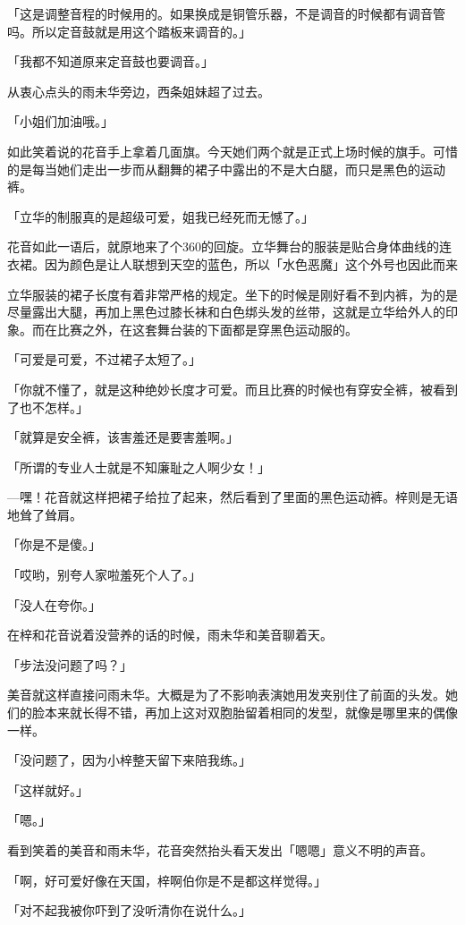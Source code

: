 \documentclass[UTF8]{ctexart}
\begin{document}
    「这是调整音程的时候用的。如果换成是铜管乐器，不是调音的时候都有调音管吗。所以定音鼓就是用这个踏板来调音的。」

    「我都不知道原来定音鼓也要调音。」

    从衷心点头的雨未华旁边，西条姐妹超了过去。

    「小姐们加油哦。」

    如此笑着说的花音手上拿着几面旗。今天她们两个就是正式上场时候的旗手。可惜的是每当她们走出一步而从翻舞的裙子中露出的不是大白腿，而只是黑色的运动裤。

    「立华的制服真的是超级可爱，姐我已经死而无憾了。」

    花音如此一语后，就原地来了个360的回旋。立华舞台的服装是贴合身体曲线的连衣裙。因为颜色是让人联想到天空的蓝色，所以「水色恶魔」这个外号也因此而来

    立华服装的裙子长度有着非常严格的规定。坐下的时候是刚好看不到内裤，为的是尽量露出大腿，再加上黑色过膝长袜和白色绑头发的丝带，这就是立华给外人的印象。而在比赛之外，在这套舞台装的下面都是穿黑色运动服的。

    「可爱是可爱，不过裙子太短了。」

    「你就不懂了，就是这种绝妙长度才可爱。而且比赛的时候也有穿安全裤，被看到了也不怎样。」

    「就算是安全裤，该害羞还是要害羞啊。」

    「所谓的专业人士就是不知廉耻之人啊少女！」

    —嘿！花音就这样把裙子给拉了起来，然后看到了里面的黑色运动裤。梓则是无语地耸了耸肩。

    「你是不是傻。」

    「哎哟，别夸人家啦羞死个人了。」

    「没人在夸你。」

    在梓和花音说着没营养的话的时候，雨未华和美音聊着天。

    「步法没问题了吗？」

    美音就这样直接问雨未华。大概是为了不影响表演她用发夹别住了前面的头发。她们的脸本来就长得不错，再加上这对双胞胎留着相同的发型，就像是哪里来的偶像一样。

    「没问题了，因为小梓整天留下来陪我练。」

    「这样就好。」

    「嗯。」

    看到笑着的美音和雨未华，花音突然抬头看天发出「嗯嗯」意义不明的声音。

    「啊，好可爱好像在天国，梓啊伯你是不是都这样觉得。」

    「对不起我被你吓到了没听清你在说什么。」
\end{document}
